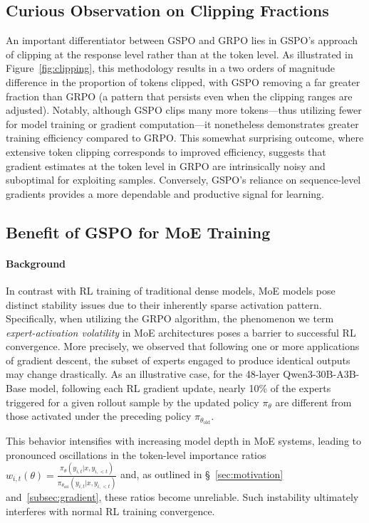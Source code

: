 \subsection{Curious Observation on Clipping Fractions}

An important differentiator between GSPO and GRPO lies in GSPO's approach of clipping at the response level rather than at the token level. As illustrated in Figure~\ref{fig:clipping}, this methodology results in a two orders of magnitude difference in the proportion of tokens clipped, with GSPO removing a far greater fraction than GRPO (a pattern that persists even when the clipping ranges are adjusted). Notably, although GSPO clips many more tokens—thus utilizing fewer for model training or gradient computation—it nonetheless demonstrates greater training efficiency compared to GRPO. This somewhat surprising outcome, where extensive token clipping corresponds to improved efficiency, suggests that gradient estimates at the token level in GRPO are intrinsically noisy and suboptimal for exploiting samples. Conversely, GSPO’s reliance on sequence-level gradients provides a more dependable and productive signal for learning.

\subsection{Benefit of GSPO for MoE Training}
\label{subsec:routing_replay}

\paragraph{Background}
In contrast with RL training of traditional dense models, MoE models pose distinct stability issues due to their inherently sparse activation pattern. Specifically, when utilizing the GRPO algorithm, the phenomenon we term \textit{expert-activation volatility} in MoE architectures poses a barrier to successful RL convergence. More precisely, we observed that following one or more applications of gradient descent, the subset of experts engaged to produce identical outputs may change drastically. As an illustrative case, for the 48-layer Qwen3-30B-A3B-Base model, following each RL gradient update, nearly 10\% of the experts triggered for a given rollout sample by the updated policy $\pi_{\theta}$ are different from those activated under the preceding policy $\pi_{\theta_\text{old}}$.

This behavior intensifies with increasing model depth in MoE systems, leading to pronounced oscillations in the token-level importance ratios $w_{i,t}(\theta) = \frac{ \pi_{\theta} (y_{i,t} | x, y_{i,<t}) }{ \pi_{\theta_\text{old}} (y_{i,t} | x,y_{i,<t})}$ and, as outlined in \S~\ref{sec:motivation} and~\ref{subsec:gradient}, these ratios become unreliable. Such instability ultimately interferes with normal RL training convergence.

